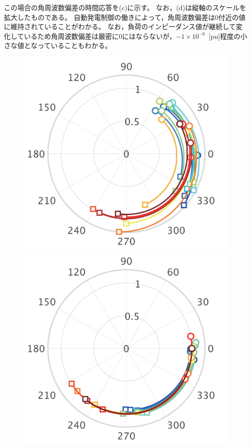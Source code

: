 \documentclass[tombow,dvipdfmx]{corona-a5-1.1}
\begin{document}
この場合の角周波数偏差の時間応答を(c)に示す。
なお，(d)は縦軸のスケールを拡大したものである。
自動発電制御の働きによって，角周波数偏差は0付近の値に維持されていることがわかる。
なお，負荷のインピーダンス値が継続して変化しているため角周波数偏差は厳密に0にはならないが，$-1\times 10^{-6}$~[pu]程度の小さな値となっていることもわかる。

\begin{figure}[t!]
  \centering
  {
  \begin{minipage}{0.49\linewidth}
    \centering
    \includegraphics[width = 0.9\linewidth]{figs/Epolar}
    \medskip
  \end{minipage}
  \begin{minipage}{0.49\linewidth}
    \centering
    \includegraphics[width = 0.9\linewidth]{figs/Vpolar}

\end{minipage}}
\end{figure}
\end{document}
